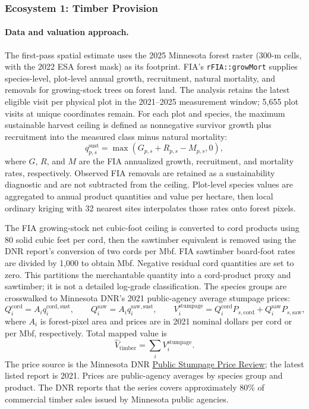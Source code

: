 \documentclass[11pt]{article}
\begin{document}
\subsubsection{Ecosystem 1: Timber Provision}


\paragraph{Data and valuation approach.}
The first-pass spatial estimate uses the 2025 Minnesota forest raster (300-m cells, with the 2022 ESA forest mask) as its footprint. FIA's \texttt{rFIA::growMort} supplies species-level, plot-level annual growth, recruitment, natural mortality, and removals for growing-stock trees on forest land. The analysis retains the latest eligible visit per physical plot in the 2021--2025 measurement window; 5,655 plot visits at unique coordinates remain. For each plot and species, the maximum sustainable harvest ceiling is defined as nonnegative survivor growth plus recruitment into the measured class minus natural mortality:
\[
q_{p,s}^{\mathrm{sust}}=
\max\left(G_{p,s}+R_{p,s}-M_{p,s},0\right),
\]
where $G$, $R$, and $M$ are the FIA annualized growth, recruitment, and mortality rates, respectively. Observed FIA removals are retained as a sustainability diagnostic and are not subtracted from the ceiling. Plot-level species values are aggregated to annual product quantities and value per hectare, then local ordinary kriging with 32 nearest sites interpolates those rates onto forest pixels.

The FIA growing-stock net cubic-foot ceiling is converted to cord products using 80 solid cubic feet per cord, then the sawtimber equivalent is removed using the DNR report's conversion of two cords per Mbf. FIA sawtimber board-foot rates are divided by 1,000 to obtain Mbf. Negative residual cord quantities are set to zero. This partitions the merchantable quantity into a cord-product proxy and sawtimber; it is not a detailed log-grade classification. The species groups are crosswalked to Minnesota DNR's 2021 public-agency average stumpage prices:
\[
Q_i^{\mathrm{cord}}=A_iq_i^{\mathrm{cord,sust}},
\qquad
Q_i^{\mathrm{saw}}=A_iq_i^{\mathrm{saw,sust}},
\qquad
V_i^{\mathrm{stumpage}}=
Q_i^{\mathrm{cord}}P_{s,\mathrm{cord}}+
Q_i^{\mathrm{saw}}P_{s,\mathrm{saw}},
\]
where $A_i$ is forest-pixel area and prices are in 2021 nominal dollars per cord or per Mbf, respectively. Total mapped value is
\[
\widehat V_{\mathrm{timber}}=\sum_i V_i^{\mathrm{stumpage}}.
\]
The price source is the Minnesota DNR \href{https://www.dnr.state.mn.us/forestry/timbersales/stumpage.html}{Public Stumpage Price Review}; the latest listed report is 2021. Prices are public-agency averages by species group and product. The DNR reports that the series covers approximately 80\% of commercial timber sales issued by Minnesota public agencies.
\end{document}
